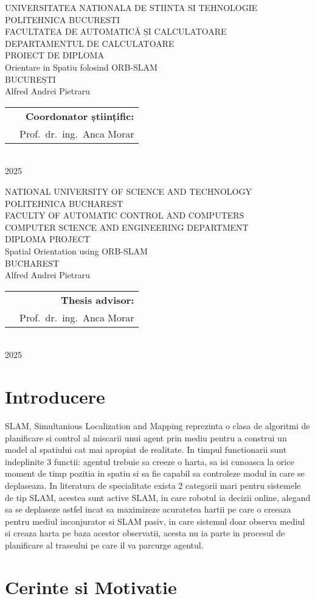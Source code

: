 \documentclass[12pt,a4paper]{report}
\makeatletter
\newcommand{\HeaderLineSpace}{-0.25cm}
\newcommand{\UniTextRO}{UNIVERSITATEA NATIONALA DE STIINTA SI TEHNOLOGIE POLITEHNICA BUCURESTI \\[\HeaderLineSpace] 
FACULTATEA DE AUTOMATICĂ ȘI CALCULATOARE \\[\HeaderLineSpace]
DEPARTAMENTUL DE CALCULATOARE\\}
\newcommand{\DiplomaRO}{PROIECT DE DIPLOMA}
\newcommand{\AdvisorRO}{Coordonator științific:}
\newcommand{\BucRO}{BUCUREȘTI}
\newcommand{\UniTextEN}{NATIONAL UNIVERSITY OF SCIENCE AND TECHNOLOGY POLITEHNICA BUCHAREST \\[\HeaderLineSpace]
FACULTY OF AUTOMATIC CONTROL AND COMPUTERS \\[\HeaderLineSpace]
COMPUTER SCIENCE AND ENGINEERING DEPARTMENT\\}
\newcommand{\DiplomaEN}{DIPLOMA PROJECT}
\newcommand{\AdvisorEN}{Thesis advisor:}
\newcommand{\BucEN}{BUCHAREST}
\newcommand{\ProjectTitleRO}{Orientare in Spatiu folosind ORB-SLAM}
\newcommand{\ProjectTitleEN}{Spatial Orientation using ORB-SLAM}
\newcommand{\frontPage}[6]{
\begin{titlepage}
\begin{center}
{\Large #1}  %
\vspace{50pt}
\vspace{105pt}
{\Huge #2}\\  %
\vspace{40pt}
{\Large #3}\\ \vspace{0pt}  %
{\Large #4}\\     %
\vspace{40pt}
{\LARGE Alfred Andrei Pietraru}\\   %
\end{center}
\vspace{60pt}
\begin{tabular*}{\textwidth}{@{\extracolsep{\fill}}p{6cm}r}
&{\large\textbf{#5}}\vspace{10pt}\\      %
&{\large Prof.\ dr.\ ing.\ Anca Morar}   %
\end{tabular*}
\vspace{20pt}
\begin{center}
{\large\textbf{#6}}\\    %
\vspace{0pt}
{\normalsize 2025}
\end{center}
\end{titlepage}
}
\newcommand{\frontPageRO}{\frontPage{\UniTextRO}{\DiplomaRO}{\ProjectTitleRO}{\BucRO}{\AdvisorRO}}
\newcommand{\frontPageEN}{\frontPage{\UniTextEN}{\DiplomaEN}{\ProjectTitleEN}{\BucEN}{\AdvisorEN}}
\makeatother
\begin{document}
\frontPageRO{}
\frontPageEN{}
\AbstractPage{}
\chapter{Introducere}
SLAM, Simultanious Localization and Mapping reprezinta o clasa de algoritmi de planificare si control 
al miscarii unui agent prin mediu pentru a construi un model al spatiului cat mai apropiat de realitate.
In timpul functionarii sunt indeplinite 3 functii: agentul trebuie sa creeze o harta, sa isi 
cunoasca la orice moment de timp pozitia in spatiu si sa fie capabil sa controleze modul in care se 
deplaseaza. In literatura de specialitate exista 2 categorii mari pentru sistemele de tip SLAM, acestea 
sunt active SLAM, in care robotul ia decizii online, alegand sa se deplaseze astfel incat sa maximizeze 
acuratetea hartii pe care o creeaza pentru mediul inconjurator si SLAM pasiv, in care sistemul doar 
observa mediul si creaza harta pe baza acestor observatii, acesta nu ia parte in procesul de planificare
al traseului pe care il va parcurge agentul.

\chapter{Cerinte si Motivatie}
\end{document}
